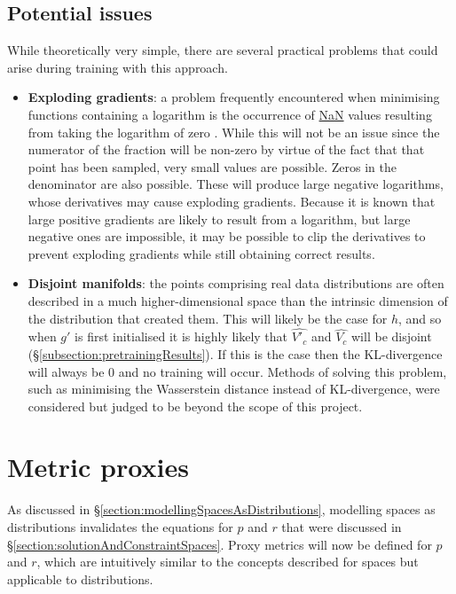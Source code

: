 \documentclass[../../main.tex]{subfiles}
\begin{document}
\subsection{Potential issues} \label{subsection:potentialIssues}

While theoretically very simple, there are several practical problems that could arise during training with this approach.
\begin{itemize}
    \item[] \textbf{Exploding gradients}: a problem frequently encountered when minimising functions containing a logarithm is the occurrence of \url{NaN} values resulting from taking the logarithm of zero \cite{bengio94}.
    While this will not be an issue since the numerator of the fraction will be non-zero by virtue of the fact that that point has been sampled, very small values are possible.
    Zeros in the denominator are also possible.
    These will produce large negative logarithms, whose derivatives may cause exploding gradients.
    Because it is known that large positive gradients are likely to result from a logarithm, but large negative ones are impossible, it may be possible to clip the derivatives to prevent exploding gradients while still obtaining correct results.   
    \item[] \textbf{Disjoint manifolds}: the points comprising real data distributions are often described in a much higher-dimensional space than the intrinsic dimension of the distribution that created them.
    This will likely be the case for $h$, and so when $g'$ is first initialised it is highly likely that $\hat{V'_c}$ and $\hat{V_c}$ will be disjoint (\S\ref{subsection:pretrainingResults}).
    If this is the case then the KL-divergence will always be 0 and no training will occur.
    Methods of solving this problem, such as minimising the Wasserstein distance instead of KL-divergence, were considered but judged to be beyond the scope of this project.
\end{itemize}

\section{Metric proxies} \label{section:metricProxies}

As discussed in \S\ref{section:modellingSpacesAsDistributions}, modelling spaces as distributions invalidates the equations for $p$ and $r$ that were discussed in \S\ref{section:solutionAndConstraintSpaces}.
Proxy metrics will now be defined for $p$ and $r$, which are intuitively similar to the concepts described for spaces but applicable to distributions.
\end{document}
